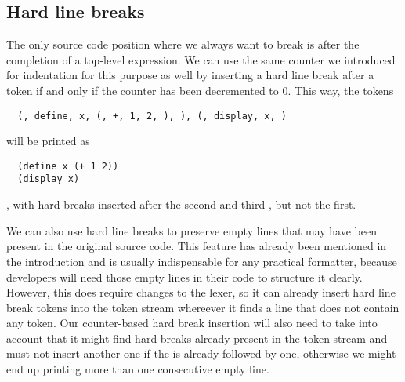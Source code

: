 \subsection{Hard line breaks}
The only source code position where we always want to break
is after the completion of a top-level expression.
We can use the same counter we introduced for indentation for this purpose as well
by inserting a hard line break after a  token if and only if
the counter has been decremented to 0.
This way, the tokens
\begin{verbatim}
  (, define, x, (, +, 1, 2, ), ), (, display, x, )
\end{verbatim}
will be printed as
\begin{verbatim}
  (define x (+ 1 2))
  (display x)
\end{verbatim}
, with hard breaks inserted after the second and third , but not the first.

We can also use hard line breaks to preserve empty lines
that may have been present in the original source code.
This feature has already been mentioned in the introduction and
is usually indispensable for any practical formatter,
because developers will need those empty lines in their code to structure it clearly.
However, this does require changes to the lexer,
so it can already insert hard line break tokens into the token stream
whereever it finds a line that does not contain any token.
Our counter-based hard break insertion will also need to take into account
that it might find hard breaks already present in the token stream
and must not insert another one if the  is already followed by one,
otherwise we might end up printing more than one consecutive empty line.

